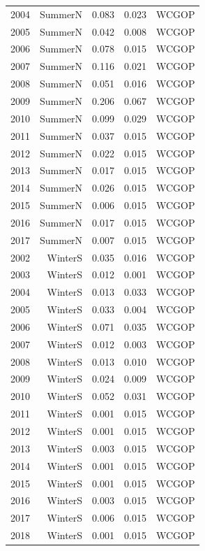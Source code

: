\documentclass[12pt,]{article}
\begin{document}
\begin{longtable}{crrrr}
  2004 & SummerN & 0.083 & 0.023 & WCGOP \\ 
  2005 & SummerN & 0.042 & 0.008 & WCGOP \\ 
  2006 & SummerN & 0.078 & 0.015 & WCGOP \\ 
  2007 & SummerN & 0.116 & 0.021 & WCGOP \\ 
  2008 & SummerN & 0.051 & 0.016 & WCGOP \\ 
  2009 & SummerN & 0.206 & 0.067 & WCGOP \\ 
  2010 & SummerN & 0.099 & 0.029 & WCGOP \\ 
  2011 & SummerN & 0.037 & 0.015 & WCGOP \\ 
  2012 & SummerN & 0.022 & 0.015 & WCGOP \\ 
  2013 & SummerN & 0.017 & 0.015 & WCGOP \\ 
  2014 & SummerN & 0.026 & 0.015 & WCGOP \\ 
  2015 & SummerN & 0.006 & 0.015 & WCGOP \\ 
  2016 & SummerN & 0.017 & 0.015 & WCGOP \\ 
  2017 & SummerN & 0.007 & 0.015 & WCGOP \\ 
  2002 & WinterS & 0.035 & 0.016 & WCGOP \\ 
  2003 & WinterS & 0.012 & 0.001 & WCGOP \\ 
  2004 & WinterS & 0.013 & 0.033 & WCGOP \\ 
  2005 & WinterS & 0.033 & 0.004 & WCGOP \\ 
  2006 & WinterS & 0.071 & 0.035 & WCGOP \\ 
  2007 & WinterS & 0.012 & 0.003 & WCGOP \\ 
  2008 & WinterS & 0.013 & 0.010 & WCGOP \\ 
  2009 & WinterS & 0.024 & 0.009 & WCGOP \\ 
  2010 & WinterS & 0.052 & 0.031 & WCGOP \\ 
  2011 & WinterS & 0.001 & 0.015 & WCGOP \\ 
  2012 & WinterS & 0.001 & 0.015 & WCGOP \\ 
  2013 & WinterS & 0.003 & 0.015 & WCGOP \\ 
  2014 & WinterS & 0.001 & 0.015 & WCGOP \\ 
  2015 & WinterS & 0.001 & 0.015 & WCGOP \\ 
  2016 & WinterS & 0.003 & 0.015 & WCGOP \\ 
  2017 & WinterS & 0.006 & 0.015 & WCGOP \\ 
  2018 & WinterS & 0.001 & 0.015 & WCGOP \\ 

\end{longtable}
\end{document}
